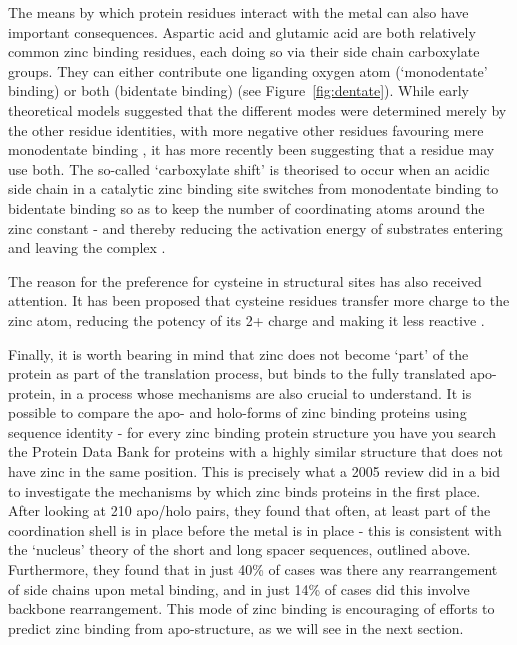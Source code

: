 The means by which protein residues interact with the metal can also have important consequences. Aspartic acid and glutamic acid are both relatively common zinc binding residues, each doing so via their side chain carboxylate groups. They can either contribute one liganding oxygen atom (`monodentate' binding) or both (bidentate binding) (see
Figure~\ref{fig:dentate}). While early theoretical models suggested that the different modes were determined merely by the other residue identities, with more negative other residues favouring mere monodentate binding \cite{ryde1999carboxylate}, it has more recently been suggesting that a residue may use both. The so-called `carboxylate shift' is theorised to occur when an acidic side chain in a catalytic zinc binding site switches from monodentate binding to bidentate binding so as to keep the number of coordinating atoms around the zinc constant - and thereby reducing the activation energy of substrates entering and leaving the complex \cite{sousa2007carboxylate}.


The reason for the preference for cysteine in structural sites has also received attention. It has been proposed that cysteine residues transfer more charge to the zinc atom, reducing the potency of its 2+ charge and making it less reactive \cite{lee2008physical}. 

Finally, it is worth bearing in mind that zinc does not become `part' of the protein as part of the translation process, but binds to the fully translated apo-protein, in a process whose mechanisms are also crucial to understand. It is possible to compare the apo- and holo-forms of zinc binding proteins using sequence identity - for every zinc binding protein structure you have you search the Protein Data Bank for proteins with a highly similar structure that does not have zinc in the same position. This is precisely what a 2005 review did \cite{babor2005flexibility} in a bid to investigate the mechanisms by which zinc binds proteins in the first place. After looking at 210 apo/holo pairs, they found that often, at least part of the coordination shell is in place before the metal is in place - this is consistent with the `nucleus' theory of the short and long spacer sequences, outlined above. Furthermore, they found that in just 40\% of cases was there any rearrangement of side chains upon metal binding, and in just 14\% of cases did this involve backbone rearrangement. This mode of zinc binding is encouraging of efforts to predict zinc binding from apo-structure, as we will see in the next section.

